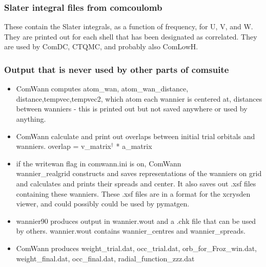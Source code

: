 \documentclass[aps,prb,singlecolumn,preprintnumbers,amsmath,amssymb]{revtex4}
\begin{document}
    

\subsubsection{Slater integral files from comcoulomb}
These contain the Slater integrals, as a function of frequency, for U, V, and W.  They are printed out for each shell that has been designated as correlated.  They are used by ComDC, CTQMC, and probably also ComLowH.

\subsubsection{Output that is never used by other parts of comsuite}
\begin{itemize}
\item ComWann computes atom\_wan, atom\_wan\_distance, distance,tempvec,tempvec2, which atom each wannier is centered at, distances between wanniers - this is printed out but not saved anywhere or used by anything.   %
 \item ComWann calculate and print out overlaps between initial trial orbitals and wanniers. overlap  = v\_matrix$^\dagger$ * a\_matrix
\item if the writewan flag in comwann.ini is on, ComWann\\wannier\_realgrid constructs and saves representations of the wanniers on grid and calculates and prints their spreads and center.  It also  saves out .xsf files containing these wanniers.  These .xsf files are in a format for the xcrysden viewer, and could possibly could be used by pymatgen.
 \item wannier90 produces output in wannier.wout and a .chk file that can be used by others.  wannier.wout contains wannier\_centres and wannier\_spreads.
 \item ComWann produces weight\_trial.dat, occ\_trial.dat, orb\_for\_Froz\_win.dat, weight\_final.dat, occ\_final.dat, radial\_function\_zzz.dat
\end{itemize}


 
\end{document}
